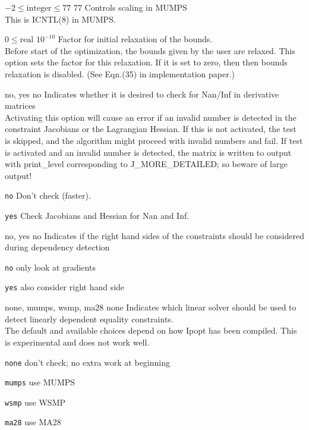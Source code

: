 %
{$-2\leq\textrm{integer}\leq77$}%
{$77$}%
{Controls scaling in MUMPS\\
This is ICNTL(8) in MUMPS.}%
{}

%
{$0\leq\textrm{real}$}%
{$10^{-10}$}%
{Factor for initial relaxation of the bounds.\\
Before start of the optimization, the bounds given by the user are relaxed.  This option sets the factor for this relaxation.  If it is set to zero, then then bounds relaxation is disabled. (See Eqn.(35) in implementation paper.)}%
{}

%
{\ttfamily no, yes}%
{no}%
{Indicates whether it is desired to check for Nan/Inf in derivative matrices\\
Activating this option will cause an error if an invalid number is detected in the constraint Jacobians or the Lagrangian Hessian.  If this is not activated, the test is skipped, and the algorithm might proceed with invalid numbers and fail.  If test is activated and an invalid number is detected, the matrix is written to output with print\_level corresponding to J\_MORE\_DETAILED; so beware of large output!}%
{\begin{list}{}{
\setlength{\parsep}{0em}
\setlength{\leftmargin}{5ex}
\setlength{\labelwidth}{2ex}
\setlength{\itemindent}{0ex}
\setlength{\topsep}{0pt}}
\item[\texttt{no}] Don't check (faster).
\item[\texttt{yes}] Check Jacobians and Hessian for Nan and Inf.
\end{list}
}

%
{\ttfamily no, yes}%
{no}%
{Indicates if the right hand sides of the constraints should be considered during dependency detection}%
{\begin{list}{}{
\setlength{\parsep}{0em}
\setlength{\leftmargin}{5ex}
\setlength{\labelwidth}{2ex}
\setlength{\itemindent}{0ex}
\setlength{\topsep}{0pt}}
\item[\texttt{no}] only look at gradients
\item[\texttt{yes}] also consider right hand side
\end{list}
}

%
{\ttfamily none, mumps, wsmp, ma28}%
{none}%
{Indicates which linear solver should be used to detect linearly dependent equality constraints.\\
The default and available choices depend on how Ipopt has been compiled.  This is experimental and does not work well.}%
{\begin{list}{}{
\setlength{\parsep}{0em}
\setlength{\leftmargin}{5ex}
\setlength{\labelwidth}{2ex}
\setlength{\itemindent}{0ex}
\setlength{\topsep}{0pt}}
\item[\texttt{none}] don't check; no extra work at beginning
\item[\texttt{mumps}] use MUMPS
\item[\texttt{wsmp}] use WSMP
\item[\texttt{ma28}] use MA28
\end{list}
}

